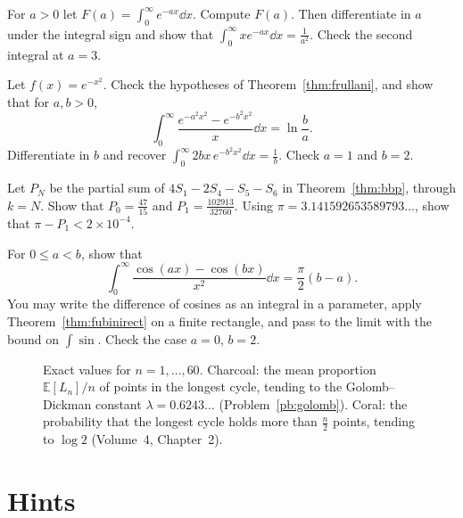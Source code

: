 \begin{exercise}[$\star$]\label{ex:rw04a}
For $a>0$ let $F(a)=\int_0^\infty e^{-ax}\dd x$. Compute $F(a)$. Then differentiate in $a$ under the integral sign and show that $\int_0^\infty x e^{-ax}\dd x=\frac1{a^2}$. Check the second integral at $a=3$.
\end{exercise}

\begin{exercise}[$\star\star$]\label{ex:rw04b}
Let $f(x)=e^{-x^2}$. Check the hypotheses of Theorem~\ref{thm:frullani}, and show that for $a,b>0$,
\[
\int_0^\infty\frac{e^{-a^2x^2}-e^{-b^2x^2}}x\dd x=\ln\frac ba.
\]
Differentiate in $b$ and recover $\int_0^\infty 2bx\,e^{-b^2x^2}\dd x=\frac1b$. Check $a=1$ and $b=2$.
\end{exercise}

\begin{exercise}[$\star\star$]\label{ex:rw04c}
Let $P_N$ be the partial sum of $4S_1-2S_4-S_5-S_6$ in Theorem~\ref{thm:bbp}, through $k=N$. Show that $P_0=\frac{47}{15}$ and $P_1=\frac{102913}{32760}$. Using $\pi=3.141592653589793\ldots$, show that $\pi-P_1<2\times10^{-4}$.
\end{exercise}

\begin{exercise}[$\star\star\star$]\label{ex:rw04d}
For $0\le a<b$, show that
\[
\int_0^\infty\frac{\cos(ax)-\cos(bx)}{x^2}\dd x=\frac\pi2(b-a).
\]
You may write the difference of cosines as an integral in a parameter, apply Theorem~\ref{thm:fubinirect} on a finite rectangle, and pass to the limit with the bound on $\int\sin$. Check the case $a=0$, $b=2$.
\end{exercise}

\begin{figure}[ht]
\centering
{}
\caption{Exact values for $n=1,\dots,60$. Charcoal: the mean proportion $\mathbb E[L_n]/n$ of points in the longest cycle, tending to the Golomb--Dickman constant $\lambda=0.6243\ldots$ (Problem~\ref{pb:golomb}). Coral: the probability that the longest cycle holds more than $\frac n2$ points, tending to $\log2$ (Volume~4, Chapter~2).}
\label{fig:longest}
\end{figure}

\section{Hints}

